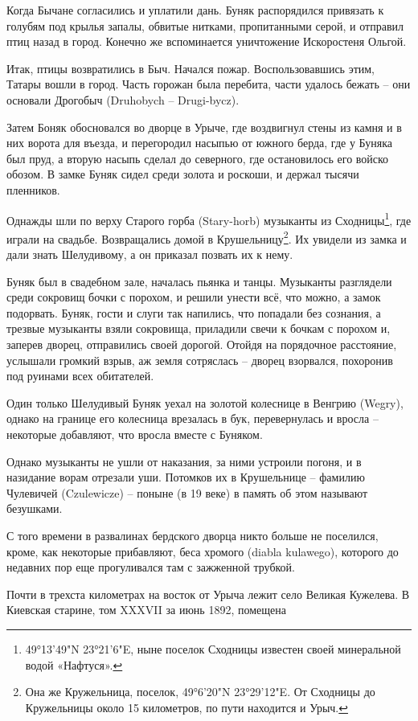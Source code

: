Когда Бычане согласились и уплатили дань. Буняк распорядился привязать к голубям под крылья запалы, обвитые нитками, пропитанными серой, и отправил птиц назад в город. Конечно же вспоминается уничтожение Искоростеня Ольгой.

Итак, птицы возвратились в Быч. Начался пожар. Воспользовавшись этим, Татары вошли в город. Часть горожан была перебита, части удалось бежать – они основали Дрогобыч (Druhobych – Drugi-bycz).

Затем Боняк обосновался во дворце в Урыче, где воздвигнул стены из камня и в них ворота для въезда, и перегородил насыпью от южного берда, где у Буняка был пруд, а вторую насыпь сделал до северного, где остановилось его войско обозом. В замке Буняк сидел среди золота и роскоши, и держал тысячи пленников.

Однажды шли по верху Старого горба (Stary-horb) музыканты из Сходницы\footnote{49°13'49"N 23°21'6"E, ныне поселок Сходницы известен своей минеральной водой «Нафтуся».}, где играли на свадьбе. Возвращались домой в Крушельницу\footnote{Она же Кружельница, поселок, 49°6'20"N 23°29'12"E. От Сходницы до Кружельницы около 15 километров, по пути находится и Урыч.}. Их увидели из замка и дали знать Шелудивому, а он приказал позвать их к нему. 

Буняк был в свадебном зале, началась пьянка и танцы. Музыканты разглядели среди сокровищ бочки с порохом, и решили унести всё, что можно, а замок подорвать. Буняк, гости и слуги так напились, что попадали без сознания, а трезвые музыканты взяли сокровища, приладили свечи к бочкам с порохом и, заперев дворец, отправились своей дорогой. Отойдя на порядочное расстояние, услышали громкий взрыв, аж земля сотряслась – дворец взорвался, похоронив под руинами всех обитателей.

Один только Шелудивый Буняк уехал на золотой колеснице в Венгрию (Wegry), однако на границе его колесница врезалась в бук, перевернулась и вросла – некоторые добавляют, что вросла вместе с Буняком.

Однако музыканты не ушли от наказания, за ними устроили погоня, и в назидание ворам отрезали уши. Потомков их в Крушельнице – фамилию Чулевичей (Czule\-wicze) – поныне (в 19 веке) в память об этом называют безушками.

С того времени в развалинах бердского дворца никто больше не поселился, кроме, как некоторые прибавляют, беса хромого (diabla kulawego), которого до недавних пор еще прогуливался там с зажженной трубкой.

Почти в трехста километрах на восток от Урыча лежит село Великая Кужелева. В Киевская старине, том XXXVII за июнь 1892, помещена

